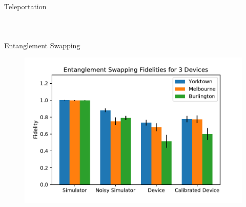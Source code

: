\begin{frame}{Teleportation}
\begin{columns}
\begin{figure}
\end{figure}
\end{columns}
\end{frame}

\begin{frame}{Entanglement Swapping}
\begin{figure} 
	\includegraphics[width=1\textwidth]{images/results/swap_histogram.pdf}
\end{figure}
\end{frame}

